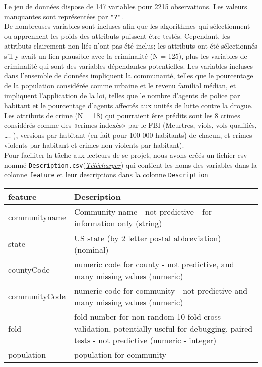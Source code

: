 \documentclass[
]{book}
\begin{document}
Le jeu de données dispose de 147 variables pour 2215 observations. Les valeurs manquantes sont représentées par \texttt{"?"}.\\
De nombreuses variables sont incluses afin que les algorithmes qui sélectionnent ou apprennent les poids des attributs puissent être testés. Cependant, les attributs clairement non liés n'ont pas été inclus; les attributs ont été sélectionnés s'il y avait un lien plausible avec la criminalité (N = 125), plus les variables de criminalité qui sont des variables dépendantes potentielles. Les variables incluses dans l'ensemble de données impliquent la communauté, telles que le pourcentage de la population considérée comme urbaine et le revenu familial médian, et impliquent l'application de la loi, telles que le nombre d'agents de police par habitant et le pourcentage d'agents affectés aux unités de lutte contre la drogue. Les attributs de crime (N = 18) qui pourraient être prédits sont les 8 crimes considérés comme des «crimes indexés» par le FBI (Meurtres, viols, vols qualifiés, \ldots. ), versions par habitant (en fait pour 100 000 habitants) de chacun, et crimes violents par habitant et crimes non violents par habitant).\\
Pour faciliter la tâche aux lecteurs de se projet, nous avons créés un fichier csv nommé \texttt{Description.csv}(\href{https://github.com/AODiakite/Data-Analysis/blob/main/data/Description.csv}{\emph{Télécharger}}) qui contient les noms des variables dans la colonne \texttt{feature} et leur descriptions dans la colonne \texttt{Description}

\begin{tabular}{l|l}
\hline
feature & Description\\
\hline
communityname & Community name - not predictive - for information only (string)\\
\hline
state & US state (by 2 letter postal abbreviation)(nominal)\\
\hline
countyCode & numeric code for county - not predictive, and many missing values (numeric)\\
\hline
communityCode & numeric code for community - not predictive and many missing values (numeric)\\
\hline
fold & fold number for non-random 10 fold cross validation, potentially useful for debugging, paired tests - not predictive (numeric - integer)\\
\hline
population & population for community\\
\hline
\end{tabular}
\end{document}
